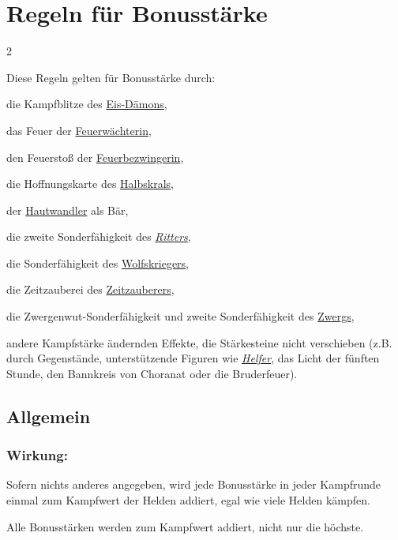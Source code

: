 \documentclass[10pt, a4paper, oneside]{book}
\newcommand{\fan}[1]{\textit{#1}}
\begin{document}
\chapter{Regeln für Bonusstärke}
\label{Bonusstärke}



\begin{multicols*}{2}\raggedcolumns

\begin{nobgcolor}


Diese Regeln gelten für Bonusstärke durch:

\bullet{} die Kampfblitze des \hyperref[Eis-Dämon]{Eis-Dämons},

\bullet{} das Feuer der \hyperref[Feuerwächterin]{Feuerwächterin},

\bullet{} den Feuerstoß der \hyperref[Feuerbezwingerin]{Feuerbezwingerin},

\bullet{} die Hoffnungskarte des \hyperref[Halbskral]{Halbskrals},

\bullet{} der \hyperref[Hautwandler]{Hautwandler} als Bär,

\bullet{} die zweite Sonderfähigkeit des \hyperref[Ritter]{\fan{Ritters}},
 
\bullet{} die Sonderfähigkeit des \hyperref[Wolfskrieger]{Wolfskriegers},

\bullet{} die Zeitzauberei des \hyperref[Zeitzauberer]{Zeitzauberers},

\bullet{} die Zwergenwut-Sonderfähigkeit und zweite Sonderfähigkeit des \hyperref[Zwerg]{Zwergs},

\bullet{} andere Kampfstärke ändernden Effekte, die Stärkesteine nicht verschieben (z.B. durch Gegenstände, unterstützende Figuren wie \hyperref[Helfer]{\fan{Helfer}}, das Licht der fünften Stunde, den Bannkreis von Choranat oder die Bruderfeuer).



\section{Allgemein}


\subsection{Wirkung:}

Sofern nichts anderes angegeben, wird jede Bonusstärke in jeder Kampfrunde einmal zum Kampfwert der Helden addiert, egal wie viele Helden kämpfen.
\supercite{17907}

Alle Bonusstärken werden zum Kampfwert addiert, nicht nur die höchste.


\end{nobgcolor}
\end{multicols*}
\end{document}
